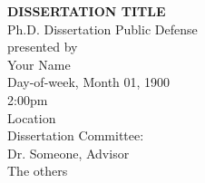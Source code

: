 \documentclass[12pt,letterpaper,epsfig,epsf]{report}
\begin{document}
\thispagestyle{empty}

	\begin{center}

   \singlespacing
	\textbf{DISSERTATION TITLE}\\
   \doublespacing
   Ph.D. Dissertation Public Defense\\
   \vspace{1.0in}
	presented by\\
	Your Name\\
   \vspace{1.0in}	
	Day-of-week, Month 01, 1900\\
   2:00pm\\
	Location\\
   \vspace{2.0in}
   \singlespacing
   Dissertation Committee:\\
   Dr. Someone, Advisor\\
   The others\\

   \end{center}
\end{document}
